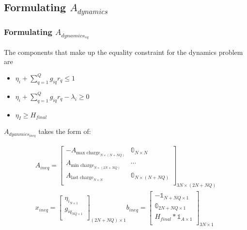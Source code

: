 \documentclass[conference]{IEEEtran}
\begin{document}
\subsection{Formulating $A_{dynamics}$}

\subsubsection{Formulating $A_{dynamics_{eq}}$}
The components that make up the equality constraint for the dynamics
problem are

\begin{itemize}
\item
  \(\eta_i + \sum_{q=1}^Q g_{iq} r_q \leq 1\)
\item
  \(\eta_i + \sum_{q=1}^Q g_{iq} r_q - \lambda_i \geq 0\)
\item
  \(\eta_{I} \geq H_{final}\)
\end{itemize}

\(A_{dyanmics_{ineq}}\) takes the form of:

\begin{equation}
\begin{array}{c}
    A_{ineq} =
    \begin{bmatrix}
        -A_{\textrm{max charge}_{N \times (N+NQ)}} & \mathbb{0}_{N \times N}        \\
        A_{\textrm{min charge}_{N \times (2N+NQ)}} & \cdots                         \\
        A_{\textrm{last charge}_{N \times N}}      & \mathbb{0}_{N \times (N + NQ)} \\
    \end{bmatrix}_{3N \times (2N + NQ)} \\
    x_{ineq} =
    \begin{bmatrix}
        \eta_{i_{N \times 1}} \\
        g_{iq_{NQ \times 1}} \\
    \end{bmatrix}_{(2N + NQ) \times 1}
    b_{ineq} =
    \begin{bmatrix}
        -\mathbb{1}_{N + NQ \times 1} \\
        \mathbb{0}_{2N + NQ \times 1} \\
        H_{final}*\mathbb{1}_{A \times 1} \\
    \end{bmatrix}_{3N \times 1}
\end{array}
\end{equation}
\end{document}

